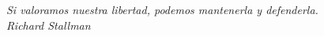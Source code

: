 \chapter*{}
\begin{flushright}
  \textit{Si valoramos nuestra libertad, podemos mantenerla y defenderla.}\\
  \textit{Richard Stallman}
\end{flushright}
